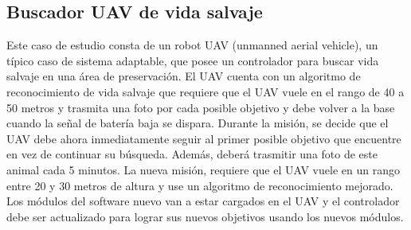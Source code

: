 


\subsection{Buscador UAV de vida salvaje}
\label{buscador_UAV}

Este caso de estudio consta de un robot UAV (unmanned aerial vehicle), un típico caso de sistema adaptable, que posee un
controlador para buscar vida salvaje en una área de preservación. El UAV cuenta con un algoritmo de reconocimiento de
vida salvaje que requiere que el UAV vuele en el rango de 40 a 50 metros y trasmita una foto por cada posible objetivo y
debe volver a la base cuando la señal de batería baja se dispara. Durante la misión, se decide que el UAV debe ahora
inmediatamente seguir al primer posible objetivo que encuentre en vez de continuar su búsqueda. Además, deberá trasmitir
una foto de este animal cada 5 minutos. La nueva misión, requiere que el UAV vuele en un rango entre 20 y 30 metros de
altura y use un algoritmo de reconocimiento mejorado. Los módulos del software nuevo van a estar cargados en el UAV y el
controlador debe ser actualizado para lograr sus nuevos objetivos usando los nuevos módulos.

